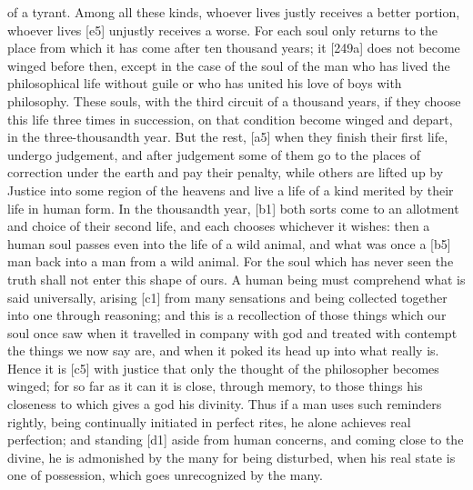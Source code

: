 of a tyrant. Among all these kinds, whoever lives justly receives a
better portion, whoever lives {[}e5{]} unjustly receives a worse. For
each soul only returns to the place from which it has come after ten
thousand years; it
{[}249a{]} does not become winged before then, except in the case of the
soul of the man who has lived the philosophical life without guile or
who has united his love of boys with philosophy. These souls, with the
third circuit of a thousand years, if they choose this life three times
in succession, on that condition become winged and depart, in the
three-thousandth year. But the rest, {[}a5{]} when they finish their
first life, undergo judgement, and after judgement some of them go to
the places of correction under the earth and pay their penalty, while
others are lifted up by Justice into some region of the heavens and live
a life of a kind merited by their life in human
form. In the thousandth
year, {[}b1{]} both sorts come to an allotment and
choice of their second
life, and each chooses whichever it wishes: then a human soul passes
even into the life of a wild animal, and what was once a {[}b5{]} man
back into a man from a wild animal. For the soul which has never seen
the truth shall not enter this shape of ours. A human being must
comprehend what is said universally, arising {[}c1{]} from many
sensations and being collected together into one through reasoning; and
this is a recollection
of those things which our soul once saw when it travelled in company
with god and treated with contempt the things we now say
are, and when it poked
its head up into what really is. Hence it is {[}c5{]} with justice that
only the thought of the philosopher becomes winged; for so far as it can
it is close, through memory, to those things his closeness to which
gives a god his divinity. Thus if a man uses such
reminders rightly, being
continually initiated in perfect rites, he alone achieves real
perfection; and standing
{[}d1{]} aside from human concerns, and coming close to the divine, he
is admonished by the many for being disturbed, when his real state is
one of possession, which goes unrecognized by the many.

